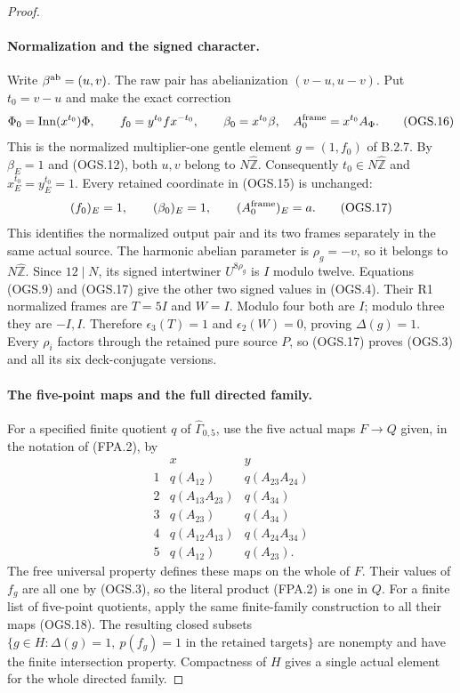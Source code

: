 \begin{proof}
\paragraph{Normalization and the signed character.}
Write $\beta^{\rm ab}=(u,v)$.
The raw pair has abelianization $(v-u,u-v)$.
Put $t_0=v-u$ and make the exact correction
\[
 \Phi_0=\operatorname{Inn}(x^{t_0})\Phi,\qquad
 f_0=y^{t_0}fx^{-t_0},\qquad
 \beta_0=x^{t_0}\beta,\quad A_0^{\rm frame}=x^{t_0}A_\Phi .
                                                               \tag{OGS.16}
\]
This is the normalized multiplier-one gentle element
$g=(1,f_0)$ of B.2.7.
By $\beta_E=1$ and (OGS.12), both $u,v$ belong
to $N\widehat{\mathbb Z}$.
Consequently $t_0\in N\widehat{\mathbb Z}$ and
$x_E^{t_0}=y_E^{t_0}=1$.
Every retained coordinate in (OGS.15) is unchanged:
\[
             (f_0)_E=1,\qquad(\beta_0)_E=1,\qquad
                          (A_0^{\rm frame})_E=a .
                                                               \tag{OGS.17}
\]
This identifies the normalized output pair and its
two frames separately in the same actual source.
The harmonic abelian parameter is $\rho_g=-v$,
so it belongs to $N\widehat{\mathbb Z}$.
Since $12\mid N$, its signed intertwiner
$U^{8\rho_g}$ is $I$ modulo twelve.
Equations (OGS.9) and (OGS.17) give the other
two signed values in (OGS.4).
Their R1 normalized frames are $T=5I$ and $W=I$.
Modulo four both are $I$; modulo three they are
$-I,I$.  Therefore $\epsilon_3(T)=1$ and
$\epsilon_2(W)=0$, proving $\Delta(g)=1$.
Every $\rho_i$ factors through the retained pure
source $P$, so (OGS.17) proves (OGS.3) and all
its six deck-conjugate versions.

\paragraph{The five-point maps and the full directed family.}
For a specified finite quotient $q$ of
$\widehat\Gamma_{0,5}$, use the five actual maps
$F\to Q$ given, in the notation of (FPA.2), by
\[
\begin{array}{c|cc}
 &x&y\\ \hline
1&q(A_{12})&q(A_{23}A_{24})\\
2&q(A_{13}A_{23})&q(A_{34})\\
3&q(A_{23})&q(A_{34})\\
4&q(A_{12}A_{13})&q(A_{24}A_{34})\\
5&q(A_{12})&q(A_{23}).
\end{array}                                                     \tag{OGS.18}
\]
The free universal property defines these maps on
the whole of $F$.
Their values of $f_g$ are all one by (OGS.3),
so the literal product (FPA.2) is one in $Q$.
For a finite list of five-point quotients, apply
the same finite-family construction to all their
maps (OGS.18).
The resulting closed subsets
$\{g\in H:\Delta(g)=1,\ p(f_g)=1\text{ in the retained targets}\}$
are nonempty and have the finite intersection property.
Compactness of $H$ gives a single actual element
for the whole directed family.


\end{proof}
